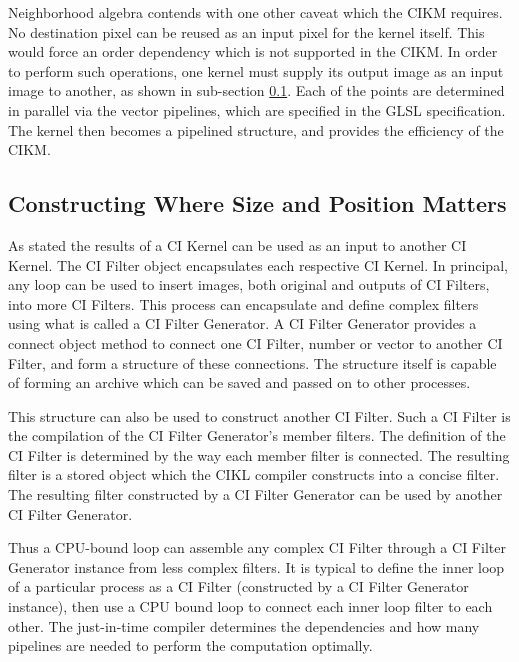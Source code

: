 \documentclass[11pt]{article}
\begin{document}
Neighborhood algebra contends with one other caveat which the CIKM requires. 
No destination pixel can be reused as an input pixel for the kernel itself.  This would force an order dependency which is not supported in the CIKM.  In order to perform such operations, one kernel must supply its output image as an input image to another, as shown in sub-section \ref{cifiltergenerator}. Each of the points are determined in parallel via the vector pipelines, which are specified in the GLSL specification.  The kernel then becomes a pipelined structure, and provides the efficiency of the CIKM.

\subsection{Constructing Where Size and Position Matters}\label{cifiltergenerator}

As stated the results of a CI Kernel can be used as an input to another CI Kernel.  The CI Filter object encapsulates each respective CI Kernel.   In principal, any loop can be used to insert images, both original and outputs of CI Filters, into more CI Filters.   This process can  encapsulate and define complex filters using what is called a CI Filter Generator.  A CI Filter Generator provides a connect object method to connect one CI Filter, number or vector to another CI Filter, and form a structure of these connections.    The structure itself is capable of forming an archive which can be saved and passed on to other processes.      

This structure can also be used to construct another CI Filter.   Such a CI Filter is the compilation of the CI Filter Generator's member filters.   The definition of the CI Filter is determined by the way each member filter is connected. %
The resulting filter is a stored object which the CIKL compiler constructs into a concise filter.   The resulting filter constructed by a CI Filter Generator can be used by another CI Filter Generator.  

Thus a CPU-bound loop can assemble any complex CI Filter through a CI Filter Generator instance from less complex filters.  It is typical to define the inner loop of a particular process as a CI Filter (constructed by a CI Filter Generator instance), then use a CPU bound loop to connect each inner loop filter to each other.  The just-in-time compiler determines the dependencies and how many pipelines are needed to perform the computation optimally.  
\end{document}
